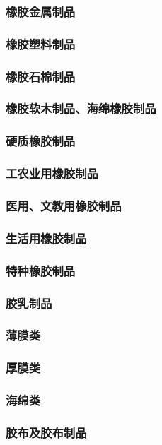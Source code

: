 \documentclass[UTF8]{../../ApplicationUniverse}
\begin{document}
        \subsubsection{橡胶金属制品}
        \subsubsection{橡胶塑料制品}
        \subsubsection{橡胶石棉制品}
        \subsubsection{橡胶软木制品、海绵橡胶制品}
        \subsubsection{硬质橡胶制品}
    \subsubsection{工农业用橡胶制品}
    \subsubsection{医用、文教用橡胶制品}
    \subsubsection{生活用橡胶制品}
    \subsubsection{特种橡胶制品}
\subsubsection{胶乳制品}
    \subsubsection{薄膜类}
    \subsubsection{厚膜类}
    \subsubsection{海绵类}
\subsubsection{胶布及胶布制品}
\end{document}
